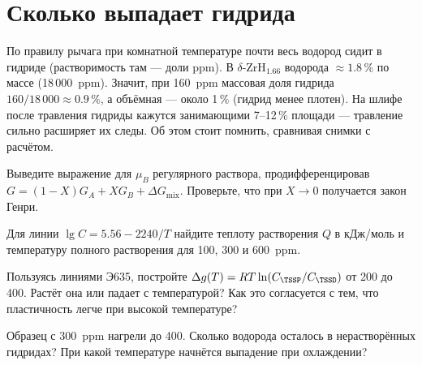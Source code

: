 \section{Сколько выпадает гидрида}

По правилу рычага при комнатной температуре почти весь водород сидит в гидриде (растворимость там --- доли ppm).
В $\delta$-ZrH$_{1.66}$ водорода $\approx 1.8$\,\% по массе (18\,000~ppm). Значит, при 160~ppm массовая доля
гидрида $160/18\,000 \approx 0.9\,\%$, а объёмная --- около 1\,\% (гидрид менее плотен). На шлифе после травления
гидриды кажутся занимающими 7--12\,\% площади --- травление сильно расширяет их следы. Об этом стоит помнить,
сравнивая снимки с расчётом.

\begin{exercise}
Выведите выражение для $\mu_B$ регулярного раствора, продифференцировав $G = (1-X)G_A + XG_B + \Delta G_{\text{mix}}$.
Проверьте, что при $X\to 0$ получается закон Генри.
\end{exercise}

\begin{exercise}
Для линии $\lg C = 5.56 - 2240/T$ найдите теплоту растворения $Q$ в кДж/моль и температуру полного растворения
для 100, 300 и 600~ppm.
\end{exercise}

\begin{exercise}
Пользуясь линиями Э635, постройте $\Delta g(T) = RT\ln(C_\TSSP/C_\TSSD)$ от 200 до 400\degC. Растёт она или падает с
температурой? Как это согласуется с тем, что пластичность легче при высокой температуре?
\end{exercise}

\begin{exercise}
Образец с 300~ppm нагрели до 400\degC. Сколько водорода осталось в нерастворённых гидридах? При какой температуре
начнётся выпадение при охлаждении?
\end{exercise}
